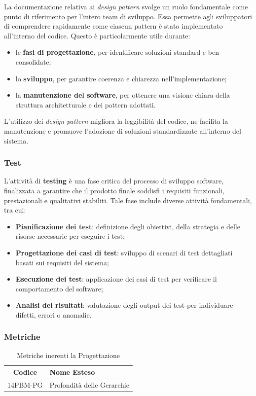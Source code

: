 La documentazione relativa ai \textit{design pattern} svolge un ruolo fondamentale come punto di riferimento per l'intero team di sviluppo. Essa permette agli sviluppatori di comprendere rapidamente come ciascun pattern è stato implementato all'interno del codice. Questo è particolarmente utile durante:
\begin{itemize}
    \item le \textbf{fasi di progettazione}, per identificare soluzioni standard e ben consolidate;
    \item lo \textbf{sviluppo}, per garantire coerenza e chiarezza nell'implementazione;
    \item la \textbf{manutenzione del software}, per ottenere una visione chiara della struttura architetturale e dei pattern adottati.
\end{itemize}
L'utilizzo dei \textit{design pattern} migliora la leggibilità del codice, ne facilita la manutenzione e promuove l'adozione di soluzioni standardizzate all'interno del sistema.

\subsubsection{Test}
L'attività di \textbf{testing} è una fase critica del processo di sviluppo software, finalizzata a garantire che il prodotto finale soddisfi i requisiti funzionali, prestazionali e qualitativi stabiliti. Tale fase include diverse attività fondamentali, tra cui:
\begin{itemize}
    \item \textbf{Pianificazione dei test}: definizione degli obiettivi, della strategia e delle risorse necessarie per eseguire i test;
    \item \textbf{Progettazione dei casi di test}: sviluppo di scenari di test dettagliati basati sui requisiti del sistema;
    \item \textbf{Esecuzione dei test}: applicazione dei casi di test per verificare il comportamento del software;
    \item \textbf{Analisi dei risultati}: valutazione degli output dei test per individuare difetti, errori o anomalie.
\end{itemize}

\subsubsection{Metriche}
\begin{table}[h!]
    \centering
    \caption{Metriche inerenti la Progettazione}
    \label{tab:metriche_progettazione}
    \begin{tabular}{|c|l|}
        \hline
        \textbf{Codice} & \textbf{Nome Esteso} \\ 
        \hline
        14PBM-PG         & Profondità delle Gerarchie \\ 
        \hline
    \end{tabular}
\end{table}






